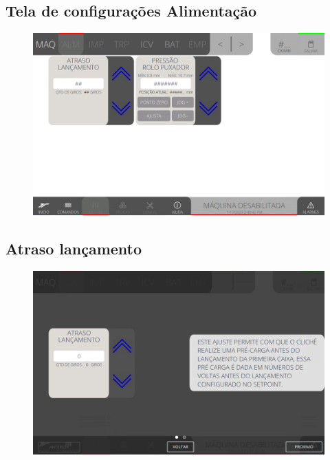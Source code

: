 \thispagestyle{fancy}
\vspace*{40 pt}
\subsection{Tela de configurações Alimentação}
\vspace*{\fill}
\begin{figure}[h]
    \centering
    \includegraphics[width=480 px,height=300 px]{src/imagesICV/03-feeder/settings/1.png}
\end{figure}
\vspace*{\fill}

\newpage
\thispagestyle{fancy}
\vspace*{40 pt}
\subsection{Atraso lançamento}
\vspace*{\fill}
\begin{figure}[h]
    \centering
    \includegraphics[width=576 px,height=360 px]{src/imagesICV/03-feeder/settings/2.png}
\end{figure}
\vspace*{\fill}

